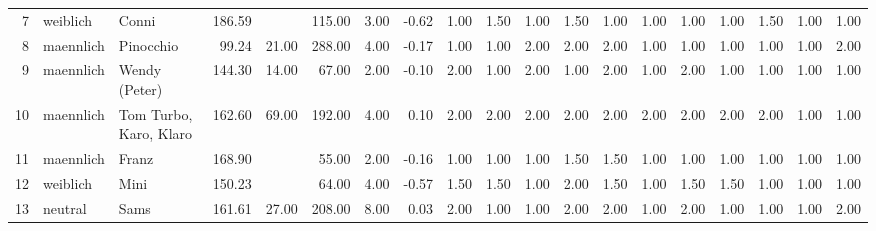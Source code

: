 \begin{table}
\begin{center}
{\begin{tabular}{rllrrrrrrrrrrrrrrrr}
  7 & weiblich & Conni                                                                                                                                                                                                                                                           & 186.59 &  & 115.00 & 3.00 & -0.62 & 1.00 & 1.50 & 1.00 & 1.50 & 1.00 & 1.00 & 1.00 & 1.00 & 1.50 & 1.00 & 1.00 \\ 
  8 & maennlich & Pinocchio                                                                                                                                                                                                                                                       & 99.24 & 21.00 & 288.00 & 4.00 & -0.17 & 1.00 & 1.00 & 2.00 & 2.00 & 2.00 & 1.00 & 1.00 & 1.00 & 1.00 & 1.00 & 2.00 \\ 
  9 & maennlich & Wendy (Peter)                                                                                                                                                                                                                                                   & 144.30 & 14.00 & 67.00 & 2.00 & -0.10 & 2.00 & 1.00 & 2.00 & 1.00 & 2.00 & 1.00 & 2.00 & 1.00 & 1.00 & 1.00 & 1.00 \\ 
  10 & maennlich & Tom Turbo, Karo, Klaro                                                                                                                                                                                                                                          & 162.60 & 69.00 & 192.00 & 4.00 & 0.10 & 2.00 & 2.00 & 2.00 & 2.00 & 2.00 & 2.00 & 2.00 & 2.00 & 2.00 & 1.00 & 1.00 \\ 
  11 & maennlich & Franz                                                                                                                                                                                                                                                           & 168.90 &  & 55.00 & 2.00 & -0.16 & 1.00 & 1.00 & 1.00 & 1.50 & 1.50 & 1.00 & 1.00 & 1.00 & 1.00 & 1.00 & 1.00 \\ 
  12 & weiblich & Mini                                                                                                                                                                                                                                                            & 150.23 &  & 64.00 & 4.00 & -0.57 & 1.50 & 1.50 & 1.00 & 2.00 & 1.50 & 1.00 & 1.50 & 1.50 & 1.00 & 1.00 & 1.00 \\ 
  13 & neutral & Sams                                                                                                                                                                                                                                                            & 161.61 & 27.00 & 208.00 & 8.00 & 0.03 & 2.00 & 1.00 & 1.00 & 2.00 & 2.00 & 1.00 & 2.00 & 1.00 & 1.00 & 1.00 & 2.00 \\ 

\end{tabular}}
\end{center}
\end{table}
